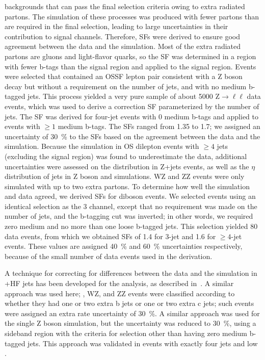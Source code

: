 \begin{description}
    backgrounds that can pass the final selection criteria owing to extra
    radiated partons. The simulation of these processes was produced with fewer
    partons than are required in the final selection, leading to large
    uncertainties in their contribution to signal channels. Therefore, SFs
    were derived to ensure good agreement between the data and the simulation. Most of
    the extra radiated partons are gluons and light-flavor quarks, so the SF was
    determined in a region with fewer b-tags than the signal region and applied
    to the signal region. Events were selected that contained an OSSF lepton pair
    consistent with a Z boson decay but without a requirement on the number of
    jets, and with no medium b-tagged jets. This process yielded a very pure sample of
    about 5000 Z$ \rightarrow \ell\ell$ data events, which was used to derive a
    correction SF parameterized by the number of jets. The SF was derived for
    four-jet events with 0 medium b-tags and applied to events with $\ge1$
    medium b-tags. The SFs ranged from 1.35 to 1.7; we assigned an uncertainty of
    \SI{30}{\percent} to the SFs based on the agreement between the data and the
    simulation. Because the simulation in OS dilepton events with $\ge4$ jets
    (excluding the signal region) was found to underestimate the data, additional
    uncertainties were assessed on the \pTmiss distribution in Z+jets events, as
    well as the $\eta$ distribution of jets in Z boson and \ttbar simulations. WZ
    and ZZ events were only simulated with up to two extra partons. To determine
    how well the simulation and data agreed, we derived SFs for diboson
    events. We selected events using an identical selection as the 3\lep \ttZ
    channel, except that no requirement was made on the number of jets, and the
    b-tagging cut was inverted; in other words, we required zero medium and no
    more than one loose b-tagged jets. This selection yielded 80 data events,
    from which we obtained SFs of 1.4 for 3-jet and 1.6 for $\ge4$-jet events.
    These values are assigned \SI{40}{\percent} and \SI{60}{\percent} uncertainties
    respectively, because of the small number of data events used in the derivation.
\end{description}

A technique for correcting for differences between the data and the simulation in
\ttbar+HF jets has been developed for the \ttH analysis, as described
in~\cite{Khachatryan2014ttH}. A similar approach was used here; \ttbar, WZ, and
ZZ events were classified according to whether they had one or two extra b jets
or one or two extra c jets; such events were assigned an extra rate uncertainty
of \SI{30}{\percent}. A similar approach was used for the single Z boson
simulation, but the uncertainty was reduced to \SI{30}{\percent}, using a sideband
region with the criteria for \ttZ selection other than having zero medium
b-tagged jets. This approach was validated in events with exactly four jets and low
\pTmiss.

